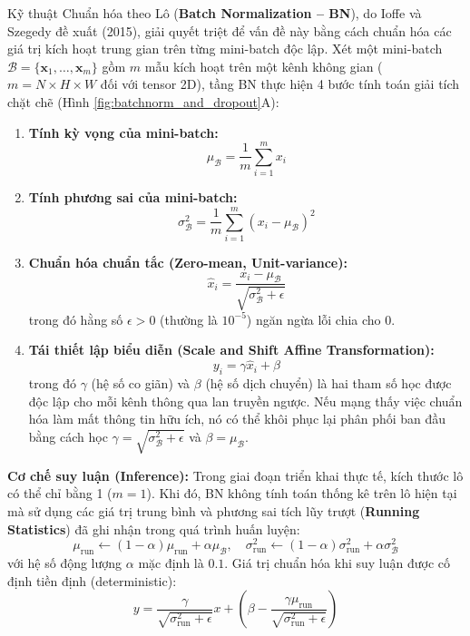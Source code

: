 \documentclass[12pt,a4paper]{report}
\begin{document}
Kỹ thuật Chuẩn hóa theo Lô (\textbf{Batch Normalization -- BN}), do Ioffe và Szegedy đề xuất (2015), giải quyết triệt để vấn đề này bằng cách chuẩn hóa các giá trị kích hoạt trung gian trên từng mini-batch độc lập. Xét một mini-batch $\mathcal{B} = \{\mathbf{x}_1, \dots, \mathbf{x}_m\}$ gồm $m$ mẫu kích hoạt trên một kênh không gian ($m = N \times H \times W$ đối với tensor 2D), tầng BN thực hiện 4 bước tính toán giải tích chặt chẽ (Hình \ref{fig:batchnorm_and_dropout}A):
\begin{enumerate}[leftmargin=*]
    \item \textbf{Tính kỳ vọng của mini-batch:}
    \begin{equation}
        \mu_{\mathcal{B}} = \frac{1}{m} \sum_{i=1}^m x_i
    \end{equation}
    \item \textbf{Tính phương sai của mini-batch:}
    \begin{equation}
        \sigma_{\mathcal{B}}^2 = \frac{1}{m} \sum_{i=1}^m (x_i - \mu_{\mathcal{B}})^2
    \end{equation}
    \item \textbf{Chuẩn hóa chuẩn tắc (Zero-mean, Unit-variance):}
    \begin{equation}
        \hat{x}_i = \frac{x_i - \mu_{\mathcal{B}}}{\sqrt{\sigma_{\mathcal{B}}^2 + \epsilon}}
    \end{equation}
    trong đó hằng số $\epsilon > 0$ (thường là $10^{-5}$) ngăn ngừa lỗi chia cho 0.
    \item \textbf{Tái thiết lập biểu diễn (Scale and Shift Affine Transformation):}
    \begin{equation}
        y_i = \gamma \hat{x}_i + \beta
    \end{equation}
    trong đó $\gamma$ (hệ số co giãn) và $\beta$ (hệ số dịch chuyển) là hai tham số học được độc lập cho mỗi kênh thông qua lan truyền ngược. Nếu mạng thấy việc chuẩn hóa làm mất thông tin hữu ích, nó có thể khôi phục lại phân phối ban đầu bằng cách học $\gamma = \sqrt{\sigma_{\mathcal{B}}^2 + \epsilon}$ và $\beta = \mu_{\mathcal{B}}$.
\end{enumerate}

\textbf{Cơ chế suy luận (Inference):} Trong giai đoạn triển khai thực tế, kích thước lô có thể chỉ bằng 1 ($m=1$). Khi đó, BN không tính toán thống kê trên lô hiện tại mà sử dụng các giá trị trung bình và phương sai tích lũy trượt (\textbf{Running Statistics}) đã ghi nhận trong quá trình huấn luyện:
\begin{equation}
    \mu_{\text{run}} \leftarrow (1 - \alpha) \mu_{\text{run}} + \alpha \mu_{\mathcal{B}}, \quad \sigma^2_{\text{run}} \leftarrow (1 - \alpha) \sigma^2_{\text{run}} + \alpha \sigma^2_{\mathcal{B}}
\end{equation}
với hệ số động lượng $\alpha$ mặc định là $0.1$. Giá trị chuẩn hóa khi suy luận được cố định tiền định (deterministic):
\begin{equation}
    y = \frac{\gamma}{\sqrt{\sigma^2_{\text{run}} + \epsilon}} x + \left( \beta - \frac{\gamma \mu_{\text{run}}}{\sqrt{\sigma^2_{\text{run}} + \epsilon}} \right)
\end{equation}
\end{document}
